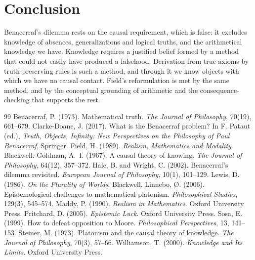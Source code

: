 \documentclass{situationist-preprint}
\begin{document}
\section{Conclusion}

Benacerraf's dilemma rests on the causal requirement, which is false: it excludes knowledge of absences, generalizations and logical truths, and the arithmetical knowledge we have. Knowledge requires a justified belief formed by a method that could not easily have produced a falsehood. Derivation from true axioms by truth-preserving rules is such a method, and through it we know objects with which we have no causal contact. Field's reformulation is met by the same method, and by the conceptual grounding of arithmetic and the consequence-checking that supports the rest.

\begin{thebibliography}{99}\small
{} Benacerraf, P. (1973). Mathematical truth. \emph{The Journal of Philosophy}, 70(19), 661--679.
 Clarke-Doane, J. (2017). What is the Benacerraf problem? In F. Pataut (ed.), \emph{Truth, Objects, Infinity: New Perspectives on the Philosophy of Paul Benacerraf}, Springer.
 Field, H. (1989). \emph{Realism, Mathematics and Modality}. Blackwell.
 Goldman, A.~I. (1967). A causal theory of knowing. \emph{The Journal of Philosophy}, 64(12), 357--372.
 Hale, B. and Wright, C. (2002). Benacerraf's dilemma revisited. \emph{European Journal of Philosophy}, 10(1), 101--129.
 Lewis, D. (1986). \emph{On the Plurality of Worlds}. Blackwell.
 Linnebo, {\O}. (2006). Epistemological challenges to mathematical platonism. \emph{Philosophical Studies}, 129(3), 545--574.
 Maddy, P. (1990). \emph{Realism in Mathematics}. Oxford University Press.
 Pritchard, D. (2005). \emph{Epistemic Luck}. Oxford University Press.
 Sosa, E. (1999). How to defeat opposition to Moore. \emph{Philosophical Perspectives}, 13, 141--153.
 Steiner, M. (1973). Platonism and the causal theory of knowledge. \emph{The Journal of Philosophy}, 70(3), 57--66.
 Williamson, T. (2000). \emph{Knowledge and Its Limits}. Oxford University Press.
\end{thebibliography}
\end{document}
